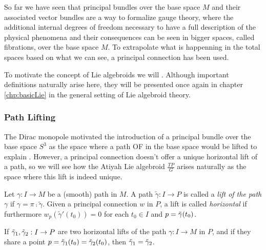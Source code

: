 So far we have seen that principal bundles over the base space $M$ and their associated vector bundles are a way to formalize gauge theory, where the additional internal degrees of freedom necessary to have a full description of the physical phenomena and their consequences can be seen in bigger spaces, called fibrations, over the base space $M$. To extrapolate what is happenning in the total spaces based on what we can see, a principal connection has been used. 

To motivate the concept of Lie algebroids we will . Although important definitions naturally arise here, they will be presented once again in chapter \ref{chp:basicLie} in the general setting of Lie algebroid theory.


\subsubsection{Path Lifting}

The Dirac monopole motivated the introduction of a principal bundle over the base space $S^3$ as the space where a path OF in the base space would be lifted to explain . However, a principal connection doesn't offer a unique horizontal lift of a path, so we will see how the Atiyah Lie algebroid $\frac{TP}{G}$ arises naturally as the space where this lift is indeed unique.

\begin{definition} 
Let $\gamma: I \to M$ be a (smooth) path in $M$. A path $\tilde{\gamma}: I \to P$ is called a \emph{lift of the path $\gamma$} if $\gamma = \pi \comp \tilde{\gamma}$. Given a principal connection $w$ in $P$, a lift is called \emph{horizontal} if furthermore $w_p(\tilde{\gamma}'(t_0)) = 0$ for each $t_0 \in I$ and $p = \Tilde{\gamma}(t_0)$.
\end{definition}

\begin{lemma} 
If $\Tilde{\gamma}_1, \Tilde{\gamma}_2:I \to P$ are two horizontal lifts of the path $\gamma:I \to M$ in $P$, and if they share a point $p = \Tilde{\gamma}_1(t_0) = \Tilde{\gamma}_2(t_0)$, then $\Tilde{\gamma}_1 = \Tilde{\gamma}_2$. 
\end{lemma}


